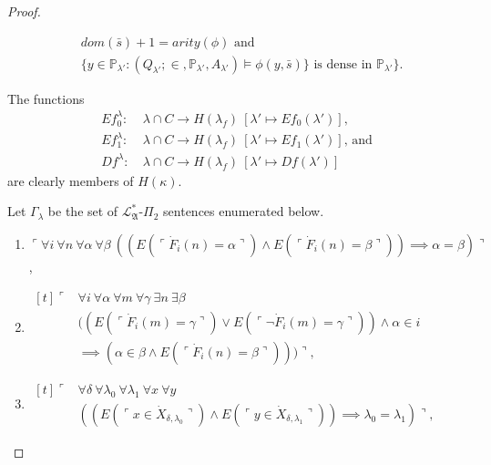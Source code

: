 \documentclass[12pt]{article}
\numberwithin{equation}{section}
\begin{document}
\begin{proof}
\begin{itemize}
\begin{align*}
        & dom(\bar{s}) + 1 = arity(\phi) \text{ and} \\
        & \{y \in \mathbb{P}_{\lambda'} : (Q_{\lambda'}; \in, \mathbb{P}_{\lambda'}, A_{\lambda'}) \models \phi(y, \bar{s})\} \text{ is dense in } \mathbb{P}_{\lambda'}\}.
    \end{align*}
\end{itemize}
The functions 
\begin{align*}
    Ef_0^{\lambda} : \ & \lambda \cap C \longrightarrow H(\lambda_f) \ [\lambda' \mapsto Ef_0(\lambda')] \text{,} \\
    Ef_1^{\lambda} : \ & \lambda \cap C \longrightarrow H(\lambda_f) \ [\lambda' \mapsto Ef_1(\lambda')] \text{, and}  \\
    Df^{\lambda} : \ & \lambda \cap C \longrightarrow H(\lambda_f) \ [\lambda' \mapsto Df(\lambda')]
\end{align*}
are clearly members of $H(\kappa)$.

\begin{defi}\label{defc}
Let $\Gamma_{\lambda}$ be the set of $\mathcal{L}^*_{\mathfrak{A}}$-$\Pi_2$ sentences enumerated below.  
\begin{enumerate}[label=(S\arabic*)$_{\lambda}$, leftmargin=40pt]
    \item\label{c1} $\ulcorner \forall i \ \forall n \ \forall \alpha \ \forall \beta \ ((E(\ulcorner \dot{F}_i (n) = \alpha \urcorner) \wedge E(\ulcorner \dot{F}_i (n) = \beta \urcorner)) \implies \alpha = \beta) \urcorner$,
    
    \item\label{c2}
    \!
    $\begin{aligned}[t]
        \ulcorner & \forall i \ \forall \alpha \ \forall m \ \forall \gamma \ \exists n \ \exists \beta \\
        & ((E(\ulcorner \dot{F}_i (m) = \gamma \urcorner) \vee E(\ulcorner \neg \dot{F}_i (m) = \gamma \urcorner)) \wedge \alpha \in i \\
        & \implies (\alpha \in \beta \wedge E(\ulcorner \dot{F}_i (n) = \beta \urcorner))) \urcorner, 
    \end{aligned}$

    \item\label{c3} 
    \!
    $\begin{aligned}[t]
        \ulcorner & \forall \delta \ \forall \lambda_0 \ \forall \lambda_1 \ \forall x \ \forall y \\
        & ((E(\ulcorner x \in \dot{X}_{\delta, \lambda_0} \urcorner) \wedge E(\ulcorner y \in \dot{X}_{\delta, \lambda_1} \urcorner)) \implies \lambda_0 = \lambda_1) \urcorner,
    \end{aligned}$


\end{enumerate}
\end{defi}
\end{proof}
\end{document}

